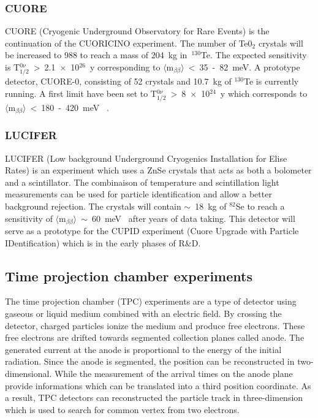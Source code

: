 \documentclass[main.tex]{subfiles}
\begin{document}
\subsubsection{CUORE}


\NI CUORE (Cryogenic Underground Observatory for Rare Events) is the continuation of the CUORICINO experiment. The number of Te0$_\text{2}$ crystals will be increased to 988 to reach a mass of 204~kg in~$^{\text{130}}$Te. The expected sensitivity is T$_{\text{1/2}}^{0\nu}$~>~2.1~$\times$~10$^{\text{26}}$~y corresponding to $\langle \text{m}_{\beta\beta} \rangle$~<~35~-~82~meV. A prototype detector, CUORE-0, consisting of 52 crystals and 10.7~kg of $^{\text{130}}$Te is currently running. A first limit have been set to T$_{\text{1/2}}^{0\nu}$~>~8~$\times$~10$^{\text{24}}$~y which corresponds to $\langle \text{m}_{\beta\beta} \rangle$~<~180~-~420~meV~\cite{CUORE} .


\subsubsection{LUCIFER}


\NI LUCIFER (Low background Underground Cryogenics Installation for Elise Rates) is an experiment which uses a ZnSe crystals that acts as both a bolometer and a scintillator. The combinaison of temperature and scintillation light measurements can be used for particle identification and allow a better background rejection. The crystals will contain $\sim$~18~kg of $^{\text{82}}$Se to reach a sensitivity of $\langle \text{m}_{\beta\beta} \rangle$~$\sim$~60~meV~\cite{LUCIFER} after years of data taking. This detector will serve as a prototype for the CUPID experiment (Cuore Upgrade with Particle IDentification) which is in the early phases of R\&D.


\subsection{Time projection chamber experiments}


\NI The time projection chamber (TPC) experiments are a type of detector using gaseous or liquid medium combined with an electric field. By crossing the detector, charged particles ionize the medium and produce free electrons. These free electrons are drifted towards segmented collection planes called anode. The generated current at the anode is proportional to the energy of the initial radiation. Since the anode is segmented, the position can be reconstructed in two-dimensional. While the measurement of the arrival times on the anode plane provide informations which can be translated into a third position coordinate. As a result, TPC detectors can reconstructed the particle track in three-dimension which is used to search for common vertex from two electrons.
\end{document}
